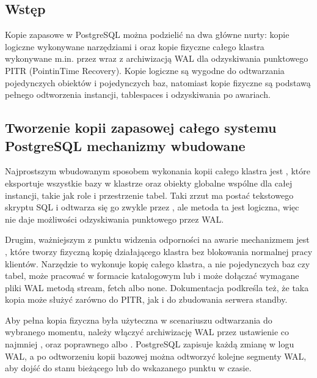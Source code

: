 \documentclass[a4paper,11pt,english,openany,oneside]{sphinxmanual}
\begin{document}
\subsection{Wstęp}
\label{\detokenize{rozdzial_2/rozdzial_28/index:wstep}}
\sphinxAtStartPar
Kopie zapasowe w PostgreSQL można podzielić na dwa główne nurty: kopie logiczne wykonywane narzędziami  i   oraz kopie fizyczne całego klastra wykonywane m.in. przez  wraz z archiwizacją WAL dla odzyskiwania punktowego PITR (Point\sphinxhyphen{}in\sphinxhyphen{}Time Recovery). Kopie logiczne są wygodne do odtwarzania pojedynczych obiektów i pojedynczych baz, natomiast kopie fizyczne są podstawą pełnego odtworzenia instancji, tablespaces i odzyskiwania po awariach.


\subsection{Tworzenie kopii zapasowej całego systemu PostgreSQL \sphinxhyphen{} mechanizmy wbudowane}
\label{\detokenize{rozdzial_2/rozdzial_28/index:tworzenie-kopii-zapasowej-calego-systemu-postgresql-mechanizmy-wbudowane}}
\sphinxAtStartPar
Najprostszym wbudowanym sposobem wykonania kopii całego klastra jest , które eksportuje wszystkie bazy w klastrze oraz obiekty globalne wspólne dla całej instancji, takie jak role i przestrzenie tabel. Taki zrzut ma postać tekstowego skryptu SQL i odtwarza się go zwykle przez , ale metoda ta jest logiczna, więc nie daje możliwości odzyskiwania punktowego przez WAL.

\sphinxAtStartPar
Drugim, ważniejszym z punktu widzenia odporności na awarie mechanizmem jest , które tworzy fizyczną kopię działającego klastra bez blokowania normalnej pracy klientów. Narzędzie to wykonuje kopię całego klastra, a nie pojedynczych baz czy tabel, może pracować w formacie katalogowym lub  i może dołączać wymagane pliki WAL metodą stream, fetch albo none. Dokumentacja podkreśla też, że taka kopia może służyć zarówno do PITR, jak i do zbudowania serwera standby.

\sphinxAtStartPar
Aby pełna kopia fizyczna była użyteczna w scenariuszu odtwarzania do wybranego momentu, należy włączyć archiwizację WAL przez ustawienie co najmniej ,  oraz poprawnego  albo . PostgreSQL zapisuje każdą zmianę w logu WAL, a po odtworzeniu kopii bazowej można odtworzyć kolejne segmenty WAL, aby dojść do stanu bieżącego lub do wskazanego punktu w czasie.
\end{document}
